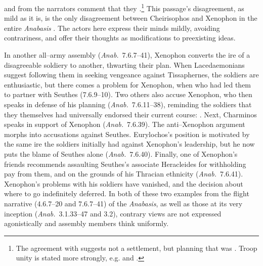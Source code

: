 \documentclass[12pt,letterpaper,oneside,final]{memoir}
\begin{document}
and from the narrators comment that they  .\footnote{The agreement with  suggests not a settlement, but planning that was . Troop unity is stated more strongly, e.g.  and .} This passage's disagreement, as mild as it is, is the only disagreement between Cheirisophos and Xenophon in the entire \emph{Anabasis} \parencite[70]{dillery1995}. The actors here express their minds mildly, avoiding contrariness, and offer their thoughts as modifications to preexisting ideas.

In another all--army assembly (\emph{Anab.}~7.6.7--41), Xenophon converts the ire of a disagreeable soldiery to another, thwarting their plan. When Lacedaemonians suggest following them in seeking vengeance against Tissaphernes, the soldiers are enthusiastic, but there comes a problem for Xenophon, when  who had led them to partner with Seuthes (7.6.9--10). Two others also accuse Xenophon, who then speaks in defense of his planning (\emph{Anab.}~7.6.11--38), reminding the soldiers that they themselves had universally endorsed their current course: . Next, Charminos speaks in support of Xenophon (\emph{Anab.}~7.6.39). The anti--Xenophon argument morphs into accusations against Seuthes. Eurylochos's position is motivated by the same ire the soldiers initially had against Xenophon's leadership, but he now puts the blame of Seuthes alone (\emph{Anab.}~7.6.40). Finally, one of Xenophon's friends recommends assaulting Seuthes's associate Heracleides for withholding pay from them, and on the grounds of his Thracian ethnicity (\emph{Anab.}~7.6.41). Xenophon's problems with his soldiers have vanished, and the decision about where to go indefinitely deferred. In both of these two examples from the flight narrative (4.6.7--20 and 7.6.7--41) of the \emph{Anabasis}, as well as those at its very inception (\emph{Anab.}~3.1.33--47 and 3.2), contrary views are not expressed agonistically and assembly members think uniformly.
\end{document}

